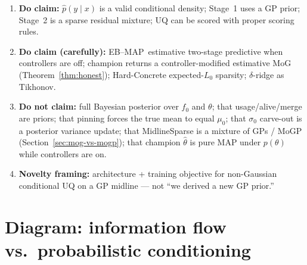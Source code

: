 \documentclass[11pt,a4paper]{article}
\theoremstyle{plain}
\theoremstyle{definition}
\theoremstyle{remark}
\newcommand{\tht}{\theta}
\newcommand{\EBMAP}{EB--MAP}
\begin{document}
\begin{enumerate}[leftmargin=1.4em]
  \item \textbf{Do claim:} \(\hat p(y\mid x)\) is a valid conditional density; Stage~1
        uses a GP prior; Stage~2 is a sparse residual mixture; UQ can be scored with
        proper scoring rules.
  \item \textbf{Do claim (carefully):} \EBMAP\ estimative two-stage predictive when
        controllers are off; champion returns a controller-modified estimative MoG
        (Theorem~\ref{thm:honest}); Hard-Concrete expected-\(L_0\) sparsity;
        \(\delta\)-ridge as Tikhonov.
  \item \textbf{Do not claim:} full Bayesian posterior over \(f_0\) and \(\tht\);
        that usage/alive/merge are priors; that pinning forces the true mean to equal
        \(\mu_0\); that \(\sigma_0\) carve-out is a posterior variance update;
        that MidlineSparse is a mixture of GPs / MoGP
        (Section~\ref{sec:mog-vs-mogp}); that champion \(\hat\tht\) is pure MAP under
        \(p(\tht)\) while controllers are on.
  \item \textbf{Novelty framing:} architecture + training objective for non-Gaussian
        conditional UQ on a GP midline --- not ``we derived a new GP prior.''
\end{enumerate}

\section{Diagram: information flow vs.\ probabilistic conditioning}
\end{document}
